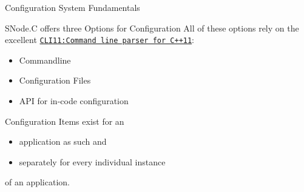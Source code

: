 ﻿

\begin{frame}[fragile]{Configuration System Fundamentals}
  \begin{block}{\alert{SNode.C} offers three Options for Configuration}
    All of these options rely on the excellent \href{https://github.com/CLIUtils/CLI11}{\texttt{\alert{CLI11:Command line parser for C++11}}}:
    \begin{itemize}
      \item Commandline
      \item Configuration Files
      \item API for in-code configuration
    \end{itemize}
    Configuration Items exist for an
    \begin{itemize}
      \item \alert{application as such} and
      \item separately for \alert{every individual instance}
    \end{itemize}
    of an application.
  \end{block}
\end{frame}
